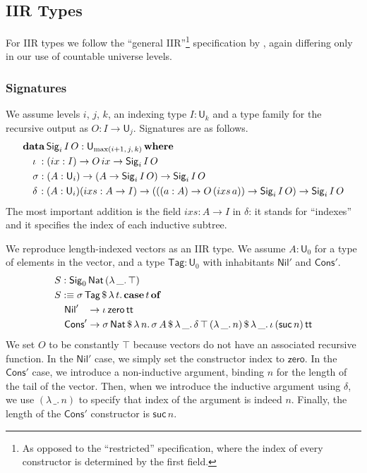 \documentclass[acmsmall,screen,review]{acmart}
\newcommand{\msf}[1]{{\mathsf{#1}}}
\newcommand{\mbf}[1]{{\mathbf{#1}}}
\newcommand{\data}{\mbf{data}}
\newcommand{\U}{\msf{U}}
\newcommand{\where}{\mbf{where}}
\newcommand{\Nat}{\msf{Nat}}
\newcommand{\zero}{\msf{zero}}
\newcommand{\suc}{\msf{suc}}
\newcommand{\Nil}{\msf{Nil}}
\newcommand{\Cons}{\msf{Cons}}
\newcommand{\Sig}{\msf{Sig}}
\newcommand{\Tag}{\msf{Tag}}
\newcommand{\case}{\mbf{case}}
\newcommand{\of}{\mbf{of}}
\newcommand{\ttt}{\msf{tt}}
\newcommand{\ix}{{ix}}
\newcommand{\ixs}{{ixs}}
\begin{document}
\subsection{IIR Types}\label{sec:iir}

For IIR types we follow the ``general IIR''\footnote{As opposed to the ``restricted'' specification,
where the index of every constructor is determined by the first field.} specification by
\citet{DBLP:journals/jlp/DybjerS06}, again differing only in our use of countable universe levels.

\subsubsection{Signatures}\label{sec:iir-signatures} We assume levels $i$, $j$, $k$, an indexing type $I : \U_k$ and a type family
for the recursive output as $O : I \to \U_j$. Signatures are as follows.
\begin{alignat*}{4}
  &\data\, \Sig_i\,I\,O : \U_{\max(i+1,\,j,\,k)}\,\where\\
  &\quad \iota\hspace{0.25em}  : (\ix : I) \to O\,\ix \to \Sig_i\,I\,O \\
  &\quad \sigma                : (A : \U_i) \to (A \to \Sig_i\,I\,O) \to \Sig_i\,I\,O \\
  &\quad \delta\hspace{0.1em}  : (A : \U_i)(\ixs : A \to I) \to (((a : A) \to O\,(\ixs\,a)) \to \Sig_i\,I\,O) \to \Sig_i\,I\,O
\end{alignat*}
The most important addition is the field $\ixs : A \to I$ in $\delta$: it stands for ``indexes'' and
it specifies the index of each inductive subtree.

\begin{example}\label{ex:vector} We reproduce length-indexed vectors as an IIR type. We assume $A : \U_0$ for a type of elements in the vector,
and a type $\Tag : \U_0$ with inhabitants $\Nil'$ and $\Cons'$.
\begin{alignat*}{4}
  & S : \Sig_0\,\Nat\,(\lambda\,\_.\,\top)\\
  & S :\equiv \sigma\,\Tag\,\$\,\lambda\,t.\,\case\,t\,\of \\
  & \quad \Nil'\hspace{0.85em} \to \iota\,\zero\,\ttt \\
  & \quad \Cons'\to \sigma\,\Nat\,\$\,\lambda\,n.\,\sigma\,A\,\$\,\lambda\,\_.\,\delta\,\top\,(\lambda\,\_.\,n)\,\$\,\lambda\,\_.\,\iota\,(\suc\,n)\,\ttt
\end{alignat*}
We set $O$ to be constantly $\top$ because vectors do not have an associated recursive function. In
the $\Nil'$ case, we simply set the constructor index to $\zero$. In the $\Cons'$ case, we introduce
a non-inductive argument, binding $n$ for the length of the tail of the vector. Then, when we
introduce the inductive argument using $\delta$, we use $(\lambda\,\_.\,n)$ to specify that index of
the argument is indeed $n$. Finally, the length of the $\Cons'$ constructor is $\suc\,n$.


\end{example}
\end{document}
